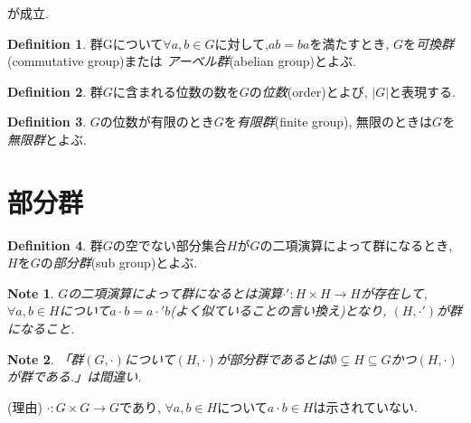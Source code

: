 \documentclass{article}
\theoremstyle{plain}
\theoremstyle{definition}
\newtheorem{definition}{Definition}
\theoremstyle{plain}
\newtheorem{note}{Note}
\numberwithin{equation}{section}
\numberwithin{theorem}{section}
\numberwithin{definition}{section}
\numberwithin{note}{section}
\begin{document}
が成立.

\begin{definition}
     群Gについて$\forall a,b\in G$に対して,$ab=ba$を満たすとき, $G$を\emph{可換群}(commutative group)または
     \emph{アーベル群}(abelian group)とよぶ.
\end{definition}
\begin{definition}
     群$G$に含まれる位数の数を$G$の\emph{位数}(order)とよび, $\lvert G\rvert$と表現する.
\end{definition}
\begin{definition}
     $G$の位数が有限のとき$G$を\emph{有限群}(finite group), 無限のときは$G$を\emph{無限群}とよぶ.
\end{definition}
\section{部分群}
\begin{definition}\label{def::subgroup}
     群$G$の空でない部分集合$H$が$G$の二項演算によって群になるとき, $H$を$G$の\emph{部分群}(sub group)とよぶ.
\end{definition}
\begin{note}
     $G$の二項演算によって群になるとは演算$\cdot': H\times H\to H$が存在して, $\forall a,b\in H$について$a\cdot b=a\cdot' b$(よく似ていることの言い換え)となり, $(H,\cdot')$が群になること.
\end{note}
\begin{note}
     「群$(G,\cdot)$について$(H,\cdot)$が部分群であるとは$\emptyset\subsetneq H\subseteq G$かつ$(H,\cdot)$が群である.」は間違い.
\end{note}
(理由) $\cdot: G\times G\to G$であり, $\forall a,b\in H$について$a\cdot b\in H$は示されていない.\\
\end{document}
